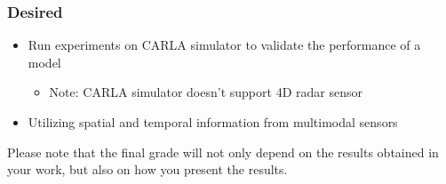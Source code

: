 \documentclass[rnd]{mas_proposal}
\begin{document}
\subsubsection*{Desired}
\begin{itemize}
    \item Run experiments on CARLA simulator to validate the performance of a model
          \begin{itemize}
              \item Note: CARLA simulator doesn't support 4D radar sensor
          \end{itemize}
    \item Utilizing spatial and temporal information from multimodal sensors


\end{itemize}

Please note that the final grade will not only depend on the results obtained in your work, but also on how you present the results.

\nocite{*}

\end{document}
